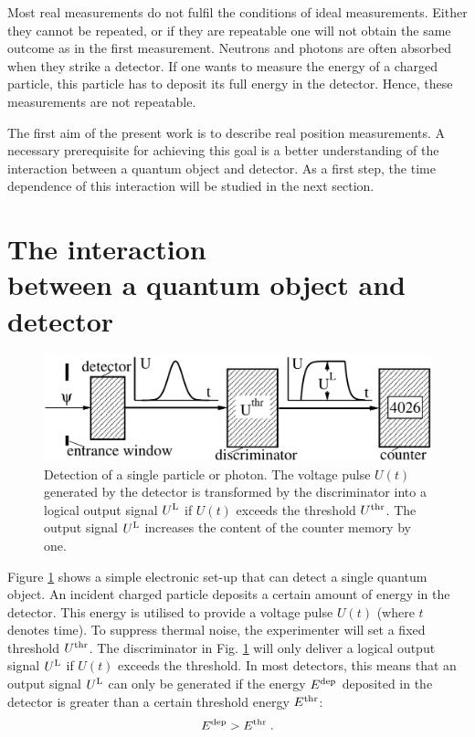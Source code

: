 \documentclass[12pt]{article}
\begin{document}
Most real measurements do not fulfil the conditions of ideal measurements.  
Either they cannot be repeated, or if they are repeatable one will not obtain the same outcome as in the first measurement.  
Neutrons and photons are often absorbed when they strike a detector.  
If one wants to measure the energy of a charged particle, this particle has to deposit its full energy in the detector.  
Hence, these measurements are not repeatable.  

The first aim of the present work is to describe real position measurements.  
A necessary prerequisite for achieving this goal is a better understanding of the interaction between a quantum object and detector.  As a first step, the time dependence of this interaction will be studied in the next section.   


\section{The interaction \\ between a quantum object and detector}\label{ch_qo-det} 

\begin{figure}[t]                                      
\centering
\includegraphics[width=11.5cm]{pos-meas-1.pdf}
\caption{Detection of a single particle or photon.  The voltage pulse $U(t)$ generated by the detector is transformed by the discriminator into a logical output signal $U^{\rm L}$ if $U(t)$ exceeds the threshold $U^{\rm thr}$.  
The output signal $U^{\rm L}$ increases the content of the counter memory by one.}\label{rAbb_pos-meas}   
\end{figure}

Figure \ref{rAbb_pos-meas} shows a simple electronic set-up that can detect a single quantum object.  An incident charged particle deposits a certain amount of energy in the detector.  
This energy is utilised to provide a voltage pulse $U(t)$ (where $t$ denotes time).  
To suppress thermal noise, the experimenter will set a fixed threshold $U^{\rm thr}$. The discriminator in Fig. \ref{rAbb_pos-meas} will only deliver a logical output signal $U^{\rm L}$ if $U(t)$ exceeds the threshold.  
In most detectors, this means that an output signal $U^{\rm L}$ can only be generated if the energy $E^{\rm dep}$ deposited in the detector is greater than a certain threshold energy $E^{\rm thr}$:  
%
\begin{equation}\label{r_E-thr}   
E^{\rm dep} > E^{\rm thr}  \;.
\end{equation} 
\end{document}

